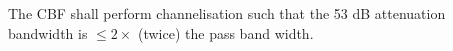 The CBF shall perform channelisation such that the 53 dB attenuation
bandwidth is $\le 2\times$ (twice) the pass band width.
